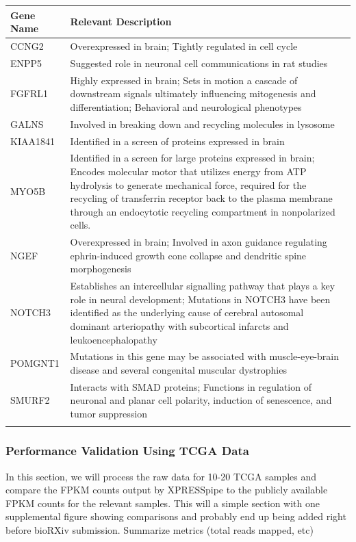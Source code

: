 \documentclass[11pt, a4paper, oneside]{article}
\begin{document}
\begin{tabular}{p{2.5cm}p{15.5cm}}
 \textbf{Gene Name} & \textbf{Relevant Description} \\
 \hline
 CCNG2 & Overexpressed in brain; Tightly regulated in cell cycle \\
 \hline
 ENPP5 & Suggested role in neuronal cell communications in rat studies \\
 \hline
 FGFRL1 & Highly expressed in brain; Sets in motion a cascade of downstream signals ultimately influencing mitogenesis and differentiation; Behavioral and neurological phenotypes \\
 \hline
 GALNS & Involved in breaking down and recycling molecules in lysosome \\
 \hline
 KIAA1841 & Identified in a screen of proteins expressed in brain \\
 \hline
 MYO5B & Identified in a screen for large proteins expressed in brain; Encodes molecular motor that utilizes energy from ATP hydrolysis to generate mechanical force, required for the recycling of transferrin receptor back to the plasma membrane through an endocytotic recycling compartment in nonpolarized cells. \\
 \hline
 NGEF & Overexpressed in brain; Involved in axon guidance regulating ephrin-induced growth cone collapse and dendritic spine morphogenesis \\
 \hline
 NOTCH3 & Establishes an intercellular signalling pathway that plays a key role in neural development; Mutations in NOTCH3 have been identified as the underlying cause of cerebral autosomal dominant arteriopathy with subcortical infarcts and leukoencephalopathy \\
 \hline
 POMGNT1 & Mutations in this gene may be associated with muscle-eye-brain disease and several congenital muscular dystrophies \\
 \hline
 SMURF2 & Interacts with SMAD proteins; Functions in regulation of neuronal and planar cell polarity, induction of senescence, and tumor suppression \\
 \label{tab:targets}
\end{tabular}
\newline

\subsubsection{Performance Validation Using TCGA Data}
In this section, we will process the raw data for 10-20 TCGA samples and compare the FPKM counts output by XPRESSpipe to the publicly available FPKM counts for the relevant samples.
This will a simple section with one supplemental figure showing comparisons and probably end up being added right before bioRXiv submission.
Summarize metrics (total reads mapped, etc)
\end{document}

